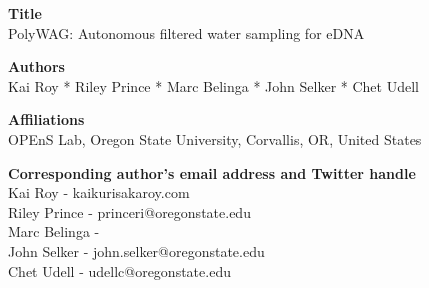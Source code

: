 \documentclass[11pt, letterpaper]{article}
\begin{document}
\begin{flushleft}



\setlength{\parindent}{0pt}
\setlength{\parskip}{10pt}


%
%
\textbf{Title} \\
PolyWAG: Autonomous filtered water sampling for eDNA 

%
%
\textbf{Authors} \\
Kai Roy * Riley Prince * Marc Belinga * John Selker * Chet Udell

%
%
\textbf{Affiliations} \\ 
OPEnS Lab, Oregon State University, Corvallis, OR, United States


%
%
\textbf{Corresponding author’s email address and Twitter handle}\\ 
Kai Roy - kaikurisakaroy\@gmail.com \\
Riley Prince - princeri@oregonstate.edu \\
Marc Belinga -  \\
John Selker - john.selker@oregonstate.edu \\
Chet Udell - udellc@oregonstate.edu



\end{flushleft}
\end{document}
